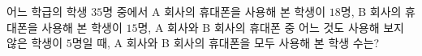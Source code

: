 어느 학급의 학생 $35$명 중에서 A 회사의 휴대폰을 사용해 본 학생이 $18$명, B 회사의 휴대폰을 사용해 본 학생이 $15$명, A 회사와 B 회사의 휴대폰 중 어느 것도 사용해 보지 않은 학생이 $5$명일 때, A 회사와 B 회사의 휴대폰을 모두 사용해 본 학생 수는?
